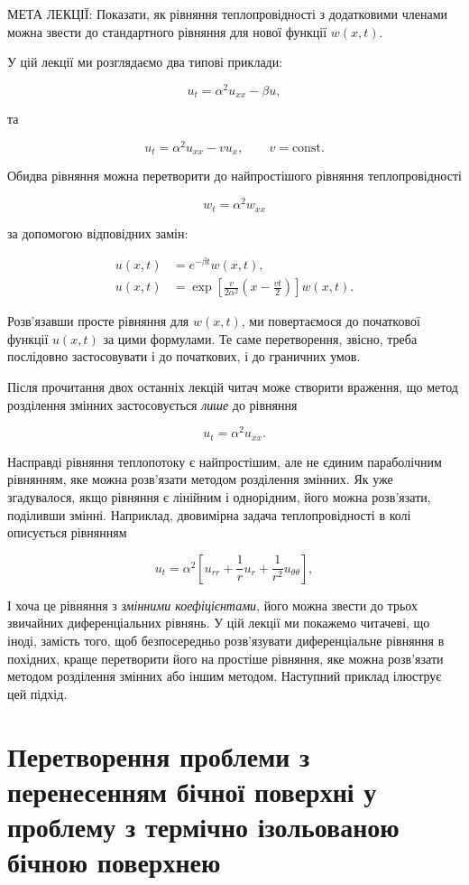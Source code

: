 МЕТА ЛЕКЦІЇ: Показати, як рівняння теплопровідності з додатковими членами можна звести до стандартного рівняння для нової функції \(w(x,t)\).

У цій лекції ми розглядаємо два типові приклади:

\[
u_t = \alpha^2 u_{xx} - \beta u,
\]

та

\[
u_t = \alpha^2 u_{xx} - v u_x, \qquad v=\text{const}.
\]

Обидва рівняння можна перетворити до найпростішого рівняння теплопровідності

\[
w_t = \alpha^2 w_{xx}
\]

за допомогою відповідних замін:

\[
\begin{aligned}
u(x,t)&=e^{-\beta t}w(x,t),\\
u(x,t)&=\exp\!\left[\frac{v}{2\alpha^2}\!\left(x-\frac{vt}{2}\right)\right]w(x,t).
\end{aligned}
\]

Розв'язавши просте рівняння для \(w(x,t)\), ми повертаємося до початкової функції \(u(x,t)\) за цими формулами. Те саме перетворення, звісно, треба послідовно застосовувати і до початкових, і до граничних умов.

Після прочитання двох останніх лекцій читач може створити враження, що метод розділення змінних застосовується \emph{лише} до рівняння

\[
u_t = \alpha^2 u_{xx}.
\]

Насправді рівняння теплопотоку є найпростішим, але не єдиним параболічним рівнянням, яке можна розв'язати методом розділення змінних. Як уже згадувалося, якщо рівняння є лінійним і однорідним, його можна розв'язати, поділивши змінні. Наприклад, двовимірна задача теплопровідності в колі описується рівнянням

\[
u_t = \alpha^2 \left[ u_{rr} + \frac{1}{r} u_r + \frac{1}{r^2} u_{\theta\theta} \right],
\]

І хоча це рівняння з \emph{змінними коефіцієнтами}, його можна звести до трьох звичайних диференціальних рівнянь. У цій лекції ми покажемо читачеві, що іноді, замість того, щоб безпосередньо розв'язувати диференціальне рівняння в похідних, краще перетворити його на простіше рівняння, яке можна розв'язати методом розділення змінних або іншим методом. Наступний приклад ілюструє цей підхід.

\section{Перетворення проблеми з перенесенням бічної поверхні у проблему з термічно ізольованою бічною поверхнею}\label{ux43fux435ux440ux435ux442ux432ux43eux440ux435ux43dux43dux44f-ux43fux440ux43eux431ux43bux435ux43cux438-ux437-ux43fux435ux440ux435ux43dux435ux441ux435ux43dux43dux44fux43c-ux431ux456ux447ux43dux43eux457-ux43fux43eux432ux435ux440ux445ux43dux456-ux443-ux43fux440ux43eux431ux43bux435ux43cux443-ux437-ux442ux435ux440ux43cux456ux447ux43dux43e-ux456ux437ux43eux43bux44cux43eux432ux430ux43dux43eux44e-ux431ux456ux447ux43dux43eux44e-ux43fux43eux432ux435ux440ux445ux43dux435ux44e}

